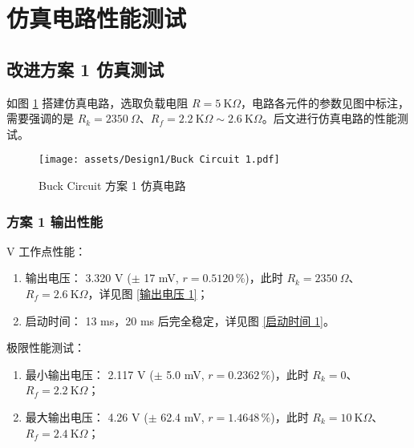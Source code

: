 \documentclass[UTF8]{article}
\def\kO{\ \mathrm{K}\Omega}
\def\KO{\ \mathrm{K}\Omega}
\def\kO{\ \mathrm{K}\Omega}
\def\KO{\ \mathrm{K}\Omega}
\theoremstyle{MyLineTheoremStyle} %
\theoremstyle{MyBlockTheoremStyle} %
\theoremstyle{MySubsubsectionStyle} %
\begin{document}
\section{仿真电路性能测试}

\subsection{改进方案 1 仿真测试}
如图 \ref{方案 1 仿真电路} 搭建仿真电路，选取负载电阻 $R = 5 \kO$，电路各元件的参数见图中标注，需要强调的是 $R_k = 2350\ \Omega$、$R_f =  2.2\KO \sim 2.6 \KO$。后文进行仿真电路的性能测试。

\begin{figure}[H]\centering
    \texttt{[image: assets/Design1/Buck Circuit 1.pdf]}
    \caption{Buck Circuit 方案 1 仿真电路}
    \label{方案 1 仿真电路}
\end{figure}

\subsubsection{方案 1 输出性能}
 V 工作点性能：
\begin{enumerate}
\item 输出电压： 3.320 V ($\pm$ 17 mV, $r = 0.5120 \,\%$)，此时 $R_k = 2350 \ \Omega$、$R_f =  2.6 \KO$，详见图 \ref{输出电压 1}；
\item 启动时间： 13 ms，20 ms 后完全稳定，详见图 \ref{启动时间 1}。
\end{enumerate}

\noindent 极限性能测试：
\begin{enumerate}
\item 最小输出电压： 2.117 V ($\pm$ 5.0 mV, $r = 0.2362 \,\%$)，此时 $R_k = 0$、$R_f =  2.2 \KO$；
\item 最大输出电压： 4.26 V ($\pm$ 62.4 mV, $r = 1.4648 \,\%$)，此时 $R_k = 10 \KO$、$R_f =  2.4\KO$；
\end{enumerate}
\end{document}
